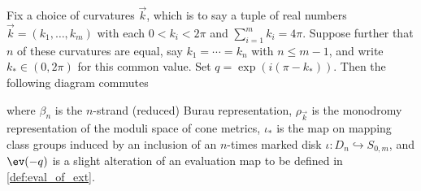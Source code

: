 \documentclass{amsart}
\begin{document}
        \begin{theorem} \label{thm:commutative_diagram}
        Fix a choice of curvatures $\vec{k}$, which is to say a tuple of real numbers $\vec k = (k_1,\dotsc,k_m)$ with each $0 < k_i < 2\pi$ and $\sum_{i=1}^m k_i=4\pi$. Suppose further that $n$ of these curvatures are equal, say $k_1=\dotsb=k_n$ with $n \leq m-1$, and write $k_* \in (0,2\pi)$ for this common value. Set $q=\exp(i(\pi-k_*))$. Then the following diagram commutes
        \begin{center}
        \end{center}
        where $\beta_n$ is the $n$-strand (reduced) Burau representation, $\rho_{\vec k}$ is the monodromy representation of the moduli space of cone metrics, $\iota_*$ is the map on mapping class groups induced by an inclusion of an $n$-times marked disk $\iota:D_n \hookrightarrow S_{0,m}$, and $\ev(-q)$ is a slight alteration of an evaluation map to be defined in \cref{def:eval_of_ext}.
    \end{theorem}
\end{document}
